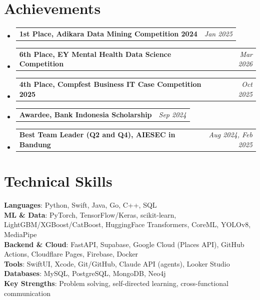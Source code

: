 \documentclass[a4paper,11pt]{article}
\makeatletter
\newcommand{\resumePOR}[3]{
\vspace{0.5mm}\item
    \begin{tabular*}{0.97\textwidth}[t]{l@{\extracolsep{\fill}}r}
        \textbf{#1}\hspace{0.3mm}#2 & \textit{\small{#3}}
    \end{tabular*}
    \vspace{-2mm}
}
\newcommand{\resumeSubHeadingListStart}{\begin{itemize}[leftmargin=*,labelsep=0mm]}
\newcommand{\resumeSubHeadingListEnd}{\end{itemize}\vspace{2mm}}
\makeatother
\begin{document}
\section{\textbf{Achievements}}
\resumeSubHeadingListStart
\resumePOR{1st Place, Adikara Data Mining Competition 2024}{}{Jan 2025}
\resumePOR{6th Place, EY Mental Health Data Science Competition}{}{Mar 2026}
\resumePOR{4th Place, Compfest Business IT Case Competition 2025}{}{Oct 2025}
\resumePOR{Awardee, Bank Indonesia Scholarship}{}{Sep 2024}
\resumePOR{Best Team Leader (Q2 and Q4), AIESEC in Bandung}{}{Aug 2024, Feb 2025}
\resumeSubHeadingListEnd
\vspace{-5.5mm}

\section{\textbf{Technical Skills}}
 \begin{itemize}[leftmargin=0.05in, label={}]
    \small{\item{
     \textbf{Languages}{: Python, Swift, Java, Go, C++, SQL} \\
     \textbf{ML \& Data}{: PyTorch, TensorFlow/Keras, scikit-learn, LightGBM/XGBoost/CatBoost, HuggingFace Transformers, CoreML, YOLOv8, MediaPipe} \\
     \textbf{Backend \& Cloud}{: FastAPI, Supabase, Google Cloud (Places API), GitHub Actions, Cloudflare Pages, Firebase, Docker} \\
     \textbf{Tools}{: SwiftUI, Xcode, Git/GitHub, Claude API (agents), Looker Studio} \\
     \textbf{Databases}{: MySQL, PostgreSQL, MongoDB, Neo4j} \\
     \textbf{Key Strengths}{: Problem solving, self-directed learning, cross-functional communication} \\
    }}
 \end{itemize}
 \vspace{-16pt}
\end{document}
